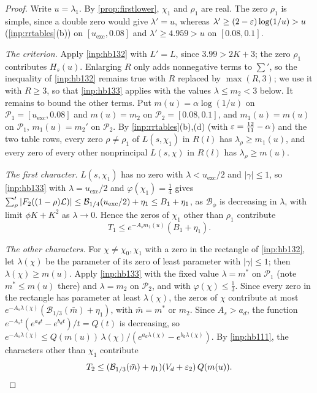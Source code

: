 \begin{proof}
Write $u=\lambda_1$. By \cref{prop:firstlower}, $\chi_1$ and $\rho_1$ are real. The zero $\rho_1$ is simple, since a
double zero would give $\lambda'=u$, whereas $\lambda'\ge(2-\varepsilon)\log(1/u)>u$ (\cref{inp:rrtables}(b)) on
$[u_{\mathrm{exc}},0.08]$ and $\lambda'\ge4.959>u$ on $[0.08,0.1]$.

\emph{The criterion.} Apply \cref{inp:hb132} with $L'=L$, since $3.99>2K+3$; the zero $\rho_1$ contributes
$H_s(u)$. Enlarging $R$ only adds nonnegative terms to $\sum'$, so the inequality of \cref{inp:hb132}
remains true with $R$ replaced by $\max(R,3)$; we use it with $R\ge3$, so that \cref{inp:hb133} applies
with the values $\lambda\le m_2<3$ below. It remains to bound the other terms. Put $m(u)=\alpha\log(1/u)$ on $\mathcal P_1=[u_{\mathrm{exc}},0.08]$ and
$m(u)=m_2$ on $\mathcal P_2=[0.08,0.1]$, and $m_1(u)=m(u)$ on $\mathcal P_1$, $m_1(u)=m_2'$ on $\mathcal P_2$. By
\cref{inp:rrtables}(b),(d) (with $\varepsilon=\frac{12}{11}-\alpha$) and the two table rows, every zero $\rho\ne\rho_1$ of
$L(s,\chi_1)$ in $R(l)$ has $\lambda_\rho\ge m_1(u)$, and every zero of every other nonprincipal $L(s,\chi)$ in
$R(l)$ has $\lambda_\rho\ge m(u)$.

\emph{The first character.} $L(s,\chi_1)$ has no zero with $\lambda<u_{\mathrm{exc}}/2$ and $|\gamma|\le1$, so
\cref{inp:hb133} with $\lambda=u_{\mathrm{exc}}/2$ and $\varphi(\chi_1)=\frac14$ gives
$\sum'_\rho|F_2((1-\rho)\mathcal{L})|\le\mathcal B_{1/4}(u_{\mathrm{exc}}/2)+\eta_1\le B_1+\eta_1$, as $\mathcal B_\phi$ is decreasing in $\lambda$, with limit $\phi K+K^2$ as $\lambda\to0$.
Hence the zeros of $\chi_1$ other than $\rho_1$ contribute
\[
  T_1\le e^{-A_sm_1(u)}(B_1+\eta_1).
\]

\emph{The other characters.} For $\chi\ne\chi_0,\chi_1$ with a zero in the rectangle of \cref{inp:hb132},
let $\lambda(\chi)$ be the parameter of its zero of least parameter with $|\gamma|\le1$; then $\lambda(\chi)\ge m(u)$.
Apply \cref{inp:hb133} with the fixed value $\lambda=m^*$ on $\mathcal P_1$ (note $m^*\le m(u)$ there) and $\lambda=m_2$
on $\mathcal P_2$, and with $\varphi(\chi)\le\frac13$. Since every zero in the rectangle has parameter at least
$\lambda(\chi)$, the zeros of $\chi$ contribute at most $e^{-A_s\lambda(\chi)}(\mathcal B_{1/3}(\bar m)+\eta_1)$, with $\bar m=m^*$
or $m_2$. Since $A_s>a_d$, the function $e^{-A_st}(e^{a_dt}-e^{b_dt})/t=Q(t)$ is decreasing, so
$e^{-A_s\lambda(\chi)}\le Q(m(u))\,\lambda(\chi)/(e^{a_d\lambda(\chi)}-e^{b_d\lambda(\chi)})$. By \cref{inp:hb111}, the characters
other than $\chi_1$ contribute
\[
  T_2\le(\mathcal B_{1/3}(\bar m)+\eta_1)(V_d+\varepsilon_2)\,Q(m(u)).
\]


\end{proof}
